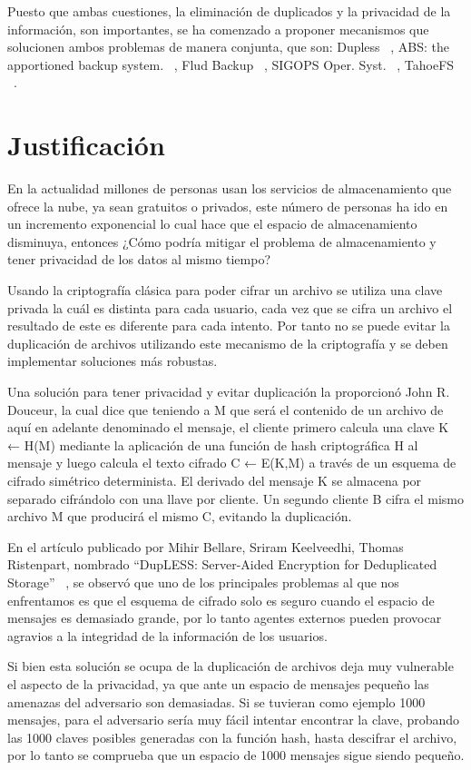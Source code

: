 Puesto que ambas cuestiones, la eliminación de duplicados y la privacidad de la información, son importantes, se ha comenzado a
proponer mecanismos que solucionen ambos problemas de manera conjunta, que son: Dupless ~\cite{Bellare}, ABS: the apportioned backup
system. ~\cite{abs}, Flud Backup ~\cite{flud}, SIGOPS Oper. Syst. ~\cite{sigops}, TahoeFS ~\cite{tahoe}.


\section{Justificación}

En la actualidad millones de personas usan los servicios de almacenamiento que ofrece la nube, ya sean gratuitos o privados, este número de personas ha ido en un incremento exponencial lo cual hace que el espacio de almacenamiento disminuya, entonces ¿Cómo podría mitigar el problema de almacenamiento y tener privacidad de los datos al mismo tiempo?

Usando la criptografía clásica para poder cifrar un archivo se utiliza una clave privada la cuál es distinta para cada usuario, cada vez que se cifra un archivo el resultado de este es diferente para cada intento. Por tanto no se puede evitar la duplicación de archivos utilizando este mecanismo de la criptografía y se deben implementar soluciones más robustas.

Una solución para tener privacidad y evitar duplicación la proporcionó John R. Douceur, la cual dice que teniendo a M que será el contenido de un archivo de aquí en adelante denominado el mensaje, el cliente primero calcula una clave K ← H(M) mediante la aplicación de una función de hash criptográfica H al mensaje y luego calcula el texto cifrado C ← E(K,M) a través de un esquema de cifrado simétrico determinista. El derivado del mensaje K se almacena por separado cifrándolo con una llave por cliente. Un segundo cliente B cifra el mismo archivo M que producirá el mismo C, evitando la duplicación. ~\cite{donceur}

En el artículo publicado por Mihir Bellare, Sriram Keelveedhi, Thomas Ristenpart, nombrado “DupLESS: Server-Aided Encryption for Deduplicated Storage” ~\cite{Bellare}, se observó que uno de los principales problemas al que nos enfrentamos es que el esquema de cifrado solo es seguro cuando el espacio de mensajes es demasiado grande, por lo tanto agentes externos pueden provocar agravios a la integridad de la información de los usuarios.

Si bien esta solución se ocupa de la duplicación de archivos deja muy vulnerable el aspecto de la privacidad, ya que ante un espacio de mensajes pequeño las amenazas del adversario son demasiadas. Si se tuvieran como ejemplo 1000 mensajes, para el adversario sería muy fácil intentar encontrar la clave, probando las 1000 claves posibles generadas con la función hash, hasta descifrar el archivo, por lo tanto se comprueba que un espacio de 1000 mensajes sigue siendo pequeño.

